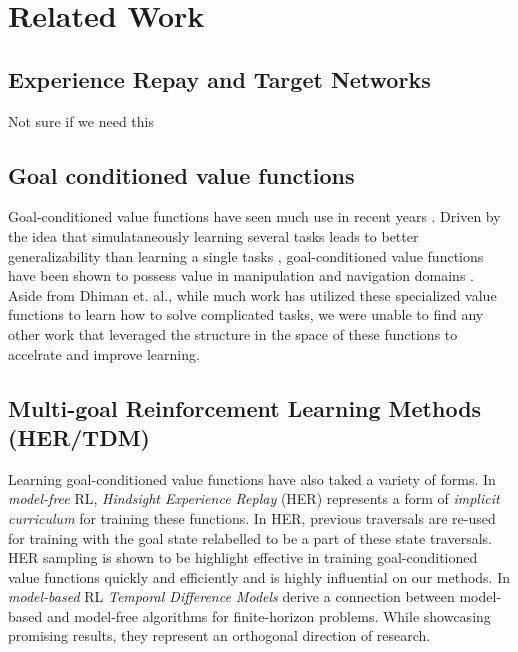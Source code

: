 \section{Related Work}

\subsection{Experience Repay and Target Networks}
Not sure if we need this

\subsection{Goal conditioned value functions}
Goal-conditioned value functions have seen much use in recent years
\citep{sutton2011horde,schaul2015universal}. Driven by the idea that
simulataneously learning several tasks leads to better generalizability
than learning a single tasks \citep{pong2018temporal}, goal-conditioned
value functions have been shown to possess value in manipulation
\citep{plappert2018multi,peng2018sim} and navigation domains \citep{
    zhang2017deep,mirowski2018learning}.  Aside from Dhiman et. al.,
while much work has utilized these specialized value functions to learn
how to solve complicated tasks, we were unable to find any other work
that leveraged the structure in the space of these functions to
accelrate and improve learning. 


\subsection{Multi-goal Reinforcement Learning Methods (HER/TDM)}
Learning goal-conditioned value functions have also taked a variety of
forms. In \emph{model-free} RL, \emph{Hindsight Experience Replay} (HER)
\citep{andrychowicz2017hindsight} represents a form of \emph{implicit
curriculum} for training these functions. In HER, previous traversals
are re-used for training with the goal state relabelled to be a part of
these state traversals. HER sampling is shown to be highlight effective
in training goal-conditioned value functions quickly and efficiently and
is highly influential on our methods. In
\emph{model-based} RL \emph{Temporal Difference Models} derive a
connection between model-based and model-free algorithms for
finite-horizon problems. While showcasing promising results, they
represent an orthogonal direction of research. 

